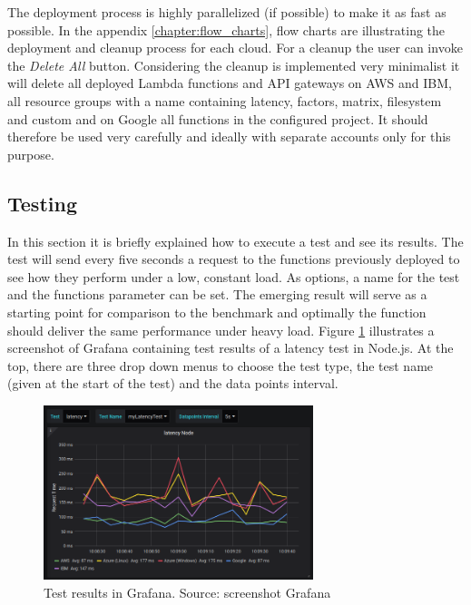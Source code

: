 The deployment process is highly parallelized (if possible) to make it as fast as possible. In the appendix \ref{chapter:flow_charts}, flow charts are illustrating the deployment and cleanup process for each cloud. For a cleanup the user can invoke the \textit{Delete All} button. Considering the cleanup is implemented very minimalist it will delete all deployed Lambda functions and \gls{API} gateways on \gls{AWS} and IBM, all resource groups with a name containing latency, factors, matrix, filesystem and custom and on Google all functions in the configured project. It should therefore be used very carefully and ideally with separate accounts only for this purpose.

\subsection{Testing}
In this section it is briefly explained how to execute a test and see its results. The test will send every five seconds a request to the functions previously deployed to see how they perform under a low, constant load. As options, a name for the test and the functions parameter can be set. The emerging result will serve as a starting point for comparison to the benchmark and optimally the function should deliver the same performance under heavy load. Figure \ref{fig:grafana} illustrates a screenshot of Grafana containing test results of a latency test in Node.js. At the top, there are three drop down menus to choose the test type, the test name (given at the start of the test) and the data points interval.

\begin{figure}[htp]
\begin{center}
\includegraphics[width=0.7\textwidth]{bilder/grafana.png}
\captionsetup{justification=centering, labelfont=bf}
\caption[Test results in Grafana]{Test results in Grafana. Source: screenshot Grafana}
\label{fig:grafana}
\end{center}
\end{figure}


